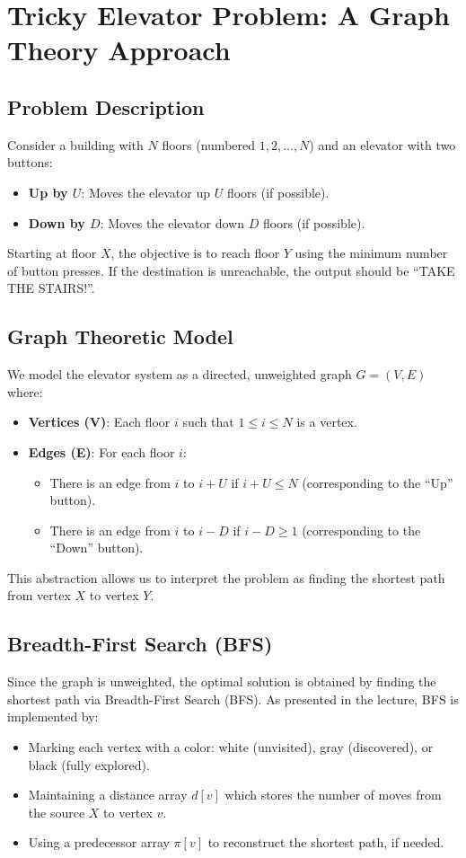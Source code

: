 \documentclass[12pt]{article}
\begin{document}
\renewcommand{\familydefault}{\rmdefault}

\section*{Tricky Elevator Problem: A Graph Theory Approach}

\subsection*{Problem Description}
Consider a building with \(N\) floors (numbered \(1,2,\ldots,N\)) and an elevator with two buttons:
\begin{itemize}
    \item \textbf{Up by \(U\)}: Moves the elevator up \(U\) floors (if possible).
    \item \textbf{Down by \(D\)}: Moves the elevator down \(D\) floors (if possible).
\end{itemize}
Starting at floor \(X\), the objective is to reach floor \(Y\) using the minimum number of button presses. If the destination is unreachable, the output should be ``TAKE THE STAIRS!''.

\subsection*{Graph Theoretic Model}
We model the elevator system as a directed, unweighted graph \(G=(V,E)\) where:
\begin{itemize}
    \item \textbf{Vertices (V)}: Each floor \(i\) such that \(1 \leq i \leq N\) is a vertex.
    \item \textbf{Edges (E)}: For each floor \(i\):
    \begin{itemize}
        \item There is an edge from \(i\) to \(i+U\) if \(i+U \leq N\) (corresponding to the ``Up'' button).
        \item There is an edge from \(i\) to \(i-D\) if \(i-D \geq 1\) (corresponding to the ``Down'' button).
    \end{itemize}
\end{itemize}
This abstraction allows us to interpret the problem as finding the shortest path from vertex \(X\) to vertex \(Y\).

\subsection*{Breadth-First Search (BFS)}
Since the graph is unweighted, the optimal solution is obtained by finding the shortest path via Breadth-First Search (BFS). As presented in the lecture, BFS is implemented by:
\begin{itemize}
    \item Marking each vertex with a color: white (unvisited), gray (discovered), or black (fully explored).
    \item Maintaining a distance array \(d[v]\) which stores the number of moves from the source \(X\) to vertex \(v\).
    \item Using a predecessor array \(\pi[v]\) to reconstruct the shortest path, if needed.
\end{itemize}
\end{document}
